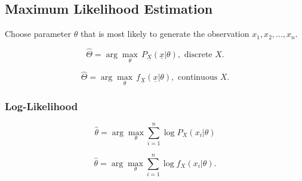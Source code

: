 \subsection{Maximum Likelihood Estimation}
\begin{motivation}
    Choose parameter $\theta$ that is most likely to generate the observation $x_1,x_2,\ldots,x_n$.
\end{motivation}

\begin{definition}
    \begin{equation}
        \hat{\Theta} = \arg\max_\theta \, P_{\underline{X}}(\underline{x}|\theta), \text{ discrete } X.
    \end{equation}
        
    \begin{equation}
        \hat{\Theta} = \arg\max_\theta \, f_{\underline{X}}(\underline{x}|\theta), \text{ continuous } X.
    \end{equation}
        
\end{definition}

\subsubsection{Log-Likelihood}
\begin{definition}
    \begin{equation}
        \hat{\theta} = \arg\max_\theta \sum_{i=1}^n \log P_X(x_i|\theta) 
    \end{equation}

    \begin{equation}
        \hat{\theta} = \arg\max_\theta \sum_{i=1}^n \log f_X(x_i|\theta).
    \end{equation}    
\end{definition}

\begin{example}
    
\end{example}

\begin{notes}
    
\end{notes}



